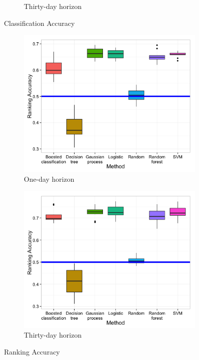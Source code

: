 \documentclass[twocolumn]{article}
\begin{document}
\begin{figure}
\begin{subfigure}{0.45\textwidth}
        \caption{Thirty-day horizon}
    \end{subfigure}
    \caption{Classification Accuracy}
    \label{fig:classification-accuracy}
\end{figure}

\begin{figure}
    \centering
    \begin{subfigure}{0.45\textwidth}
        \centering
        \includegraphics[width=\linewidth]{figures/performance-sample-5000-OneDayHorizon.png}
        \caption{One-day horizon}
    \end{subfigure}
    \begin{subfigure}{0.45\textwidth}
        \centering
        \includegraphics[width=\linewidth]{figures/performance-sample-5000-OneMonthHorizon.png}
        \caption{Thirty-day horizon}
    \end{subfigure}
    \caption{Ranking Accuracy}
    \label{fig:ranking-accuracy}
\end{figure}
\end{document}
